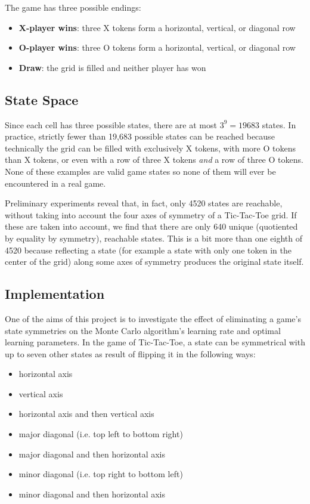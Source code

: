 \documentclass[11pt,a4paper]{report}
\begin{document}
The game has three possible endings:

\begin{itemize}
	\item \textbf{X-player wins}: three X tokens form a horizontal, vertical, or diagonal row
	\item \textbf{O-player wins}: three O tokens form a horizontal, vertical, or diagonal row
	\item \textbf{Draw}: the grid is filled and neither player has won
\end{itemize}


\subsection{State Space}
\label{sec:TicTacToeStateSpace}

Since each cell has three possible states, there are at most $3^9 = 19683$ states. In practice, strictly fewer than 19,683 possible states can be reached because technically the grid can be filled with exclusively X tokens, with more O tokens than X tokens, or even with a row of three X tokens \emph{and} a row of three O tokens. None of these examples are valid game states so none of them will ever be encountered in a real game.

Preliminary experiments reveal that, in fact, only 4520 states are reachable, without taking into account the four axes of symmetry of a Tic-Tac-Toe grid. If these are taken into account, we find that there are only 640 unique (quotiented by equality by symmetry), reachable states. This is a bit more than one eighth of 4520 because reflecting a state (for example a state with only one token in the center of the grid) along some axes of symmetry produces the original state itself.


\subsection{Implementation}
\label{sec:TicTacToeImplementation}

One of the aims of this project is to investigate the effect of eliminating a game's state symmetries on the Monte Carlo algorithm's learning rate and optimal learning parameters. In the game of Tic-Tac-Toe, a state can be symmetrical with up to seven other states as result of flipping it in the following ways:

\begin{itemize}
	\item horizontal axis
	\item vertical axis
	\item horizontal axis and then vertical axis
	\item major diagonal (i.e. top left to bottom right)
	\item major diagonal and then horizontal axis
	\item minor diagonal (i.e. top right to bottom left)
	\item minor diagonal and then horizontal axis
\end{itemize}
\end{document}
